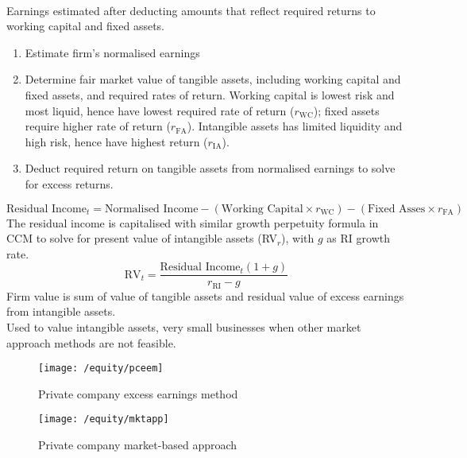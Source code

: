\begin{method} \\
Earnings estimated after deducting amounts that reflect required returns to working capital and fixed assets.
\begin{enumerate}[label=\arabic*.]
\setlength{\itemsep}{0pt}
\item Estimate firm's normalised earnings
\item Determine fair market value of tangible assets, including working capital and fixed assets, and required rates of return. Working capital is lowest risk and most liquid, hence have lowest required rate of return ($r_{\text{WC}}$); fixed assets require higher rate of return ($r_{\text{FA}}$). Intangible assets has limited liquidity and high risk, hence have highest return ($r_{\text{IA}}$).
\item Deduct required return on tangible assets from normalised earnings to solve for excess returns.
\end{enumerate}
\begin{equation}
\text{Residual Income}_t = \text{Normalised Income} - (\text{Working Capital} \times r_{\text{WC}}) - (\text{Fixed Asses} \times r_{\text{FA}}) \nonumber
\end{equation}
The residual income is capitalised with similar growth perpetuity formula in CCM to solve for present value of intangible assets (RV$_r$), with $g$ as RI growth rate.
\begin{equation}
\text{RV}_t = \frac{\text{Residual Income}_t (1+g)}{r_{\text{RI}} - g} \nonumber
\end{equation}
Firm value is sum of value of tangible assets and residual value of excess earnings from intangible assets.\\
Used to value intangible assets, very small businesses when other market approach methods are not feasible.
\end{method}

\begin{figure}[H]
\centering
\texttt{[image: /equity/pceem]}
\caption{Private company excess earnings method}
\end{figure}

\begin{figure}[H]
\centering
\texttt{[image: /equity/mktapp]}
\caption{Private company market-based approach}
\end{figure}

